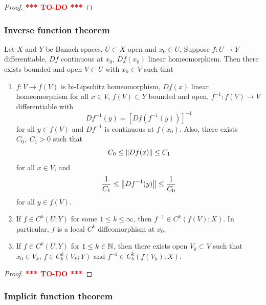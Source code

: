 \documentclass[a4paper]{article}
\newcommand{\TODO}{\textcolor{red}{\textbf{*** TO-DO ***}}}
\begin{document}
\begin{proof}
  \TODO
\end{proof}

\subsubsection{Inverse function theorem}

\begin{thm}
  Let $X$ and $Y$ be Banach spaces, $U \subset X$ open and
  $x_0 \in U$. Suppose $f: U \to Y$ differentiable,
  $Df$ continuous at $x_0$, $Df(x_0)$ linear homeomorphism.
  Then there exists bounded and open $V \subset U$ with
  $x_0 \in V$ such that
  \begin{enumerate}
    \item $f: V \to f(V)$ is bi-Lipschitz homeomorphism,
          $Df(x)$ linear homeomorphism for all $x \in V$,
          $f(V) \subset Y$ bounded and open, $f^{-1} : f(V) \to V$
          differentiable with
          \[
            Df^{-1}(y) = [Df(f^{-1}(y))]^{-1}
          \]
          for all $y \in f(V)$ and $Df^{-1}$ is continuous at $f(x_0)$.
          Also, there exists $C_0, \; C_1 > 0$ such that
          \[
            C_0 \leq \left\lVert Df(x)\right\rVert \leq C_1
          \]
          for all $x \in V$, and
          \[
            \frac{1}{C_1} \leq \left\lVert Df^{-1}(y)\right\rVert \leq \frac{1}{C_0}
          \]
          for all $y \in f(V)$.
    \item If $f \in C^k(U; Y)$ for some $1 \leq k \leq \infty$, then
          $f^{-1} \in C^k(f(V); X)$. In particular, $f$ is a local $C^k$
          diffeomorphism at $x_0$.
    \item If $f \in C^k(U; Y)$ for $1 \leq k \in \mathbb{N}$, then there exists
          open $V_k \subset V$ such that $x_0 \in V_k$, $f \in C^k_b(V_k ;
          Y)$ and $f^{-1} \in C^k_b(f(V_k) ; X)$.
  \end{enumerate}
\end{thm}

\begin{proof}
  \TODO
\end{proof}

\subsubsection{Implicit function theorem}
\end{document}
